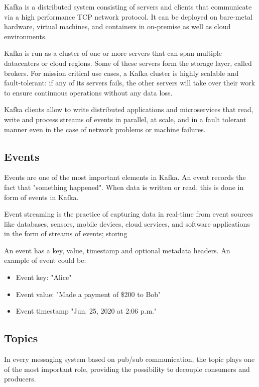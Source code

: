 Kafka is a distributed system consisting of servers and clients that
communicate via a high performance TCP network protocol.  It can be deployed
on bare-metal hardware, virtual machines, and containers in on-premise as well
as cloud environments.

Kafka is run as a cluster of one or more servers that can span multiple
datacenters or cloud regions. Some of these servers form the storage layer,
called brokers. For mission critical use cases, a Kafka cluster is highly
scalable and fault-tolerant: if any of its servers fails, the other servers
will take over their work to ensure continuous operations without any data
loss.

Kafka clients allow to write distributed applications and microservices that
read, write and process streams of events in parallel, at scale, and in a fault
tolerant manner even in the case of network problems or machine failures.

\subsection{Events}

Events are one of the most important elements in Kafka.
An event records the fact that "something happened". When data is written or
read, this is done in form of events in Kafka. \cite{kafka_documentation}

Event streaming is the practice of capturing data in real-time from event
sources like databases, sensors, mobile devices, cloud services, and software
applications in the form of streams of events; storing 

An event has a key, value, timestamp and optional metadata headers. An example
of event could be:

\begin{itemize}
    \item   Event key: "Alice"
    \item   Event value: "Made a payment of \$200 to Bob"
    \item   Event timestamp "Jun. 25, 2020 at 2:06 p.m."
\end{itemize}

\subsection{Topics}

In every messaging system based on pub/sub communication, the topic plays one
of the most important role, providing the possibility to decouple consumers
and producers.


